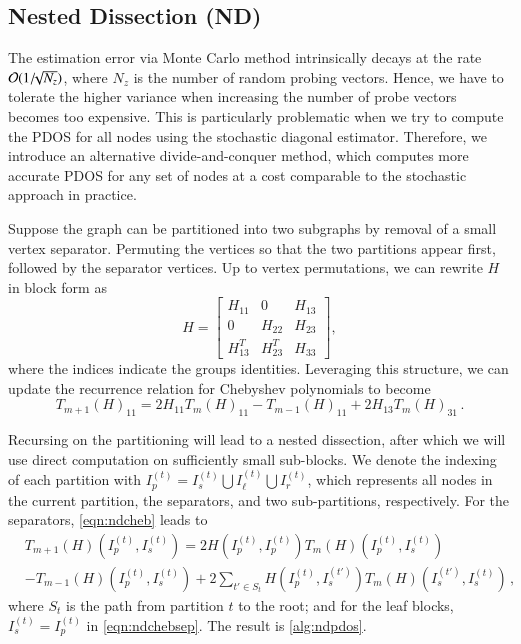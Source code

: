 \subsection{Nested Dissection (ND)}

The estimation error via Monte Carlo method intrinsically decays at the rate
$\mathcal{O}(1 /\!\!\sqrt{N_z})$, where $N_z$ is the number of random probing vectors.
Hence, we have to tolerate the higher variance when increasing the number of
probe vectors becomes too expensive. This is particularly problematic when we
try to compute the PDOS for all nodes using the stochastic diagonal estimator.
Therefore, we introduce an alternative divide-and-conquer  method, which
computes more accurate PDOS for any set of nodes at a cost comparable to the
stochastic approach in practice.

Suppose the graph can be partitioned into two subgraphs by removal of a small
vertex separator.  Permuting the vertices so that the two partitions appear
first, followed by the separator vertices. Up to vertex permutations, we can
rewrite $H$ in block form as
\begin{equation}\label{eqn:dissection}
	H = \begin{bmatrix}
	H_{11} & 0 & H_{13}\\
	0 & H_{22} & H_{23}\\
	H_{13}^T & H_{23}^T & H_{33}
	\end{bmatrix},
\end{equation}
where the indices indicate the groups identities. Leveraging this structure, we
can update the recurrence relation for Chebyshev polynomials to become
\begin{equation}\label{eqn:ndcheb}
	T_{m+1}(H)_{11} = 2H_{11}T_m(H)_{11} - T_{m-1}(H)_{11} + 2H_{13}T_m(H)_{31}\,.
\end{equation}

Recursing on the partitioning will lead to a nested dissection, after which we
will use direct computation on sufficiently small sub-blocks. We denote the
indexing of each partition with $I^{(t)}_p = I^{(t)}_s\bigcup I^{
(t)}_\ell\bigcup I^{(t)}_r$, which represents all nodes in the current
partition, the separators, and two sub-partitions, respectively. For the
separators, \cref{eqn:ndcheb} leads to
\begin{align}\label{eqn:ndchebsep}
	&T_{m+1}(H)(I^{(t)}_p,I^{(t)}_s) = 2H(I^{(t)}_p, I^{(t)}_p)T_m(H)(I^{(t)}_p,
	I^{(t)}_s) \nonumber\\
	&-T_{m-1}(H)(I^{(t)}_p,I^{(t)}_s) + 2\sum_{t'\in S_t}H(I^{(t)}_p,I^{(t')}_s)
	T_m(H)(I^{(t')}_s, I^{(t)}_s)\,,
\end{align}
where $S_t$ is the path from partition $t$ to the root; and for the leaf
blocks, $I^{(t)}_s = I^{(t)}_p$ in \cref{eqn:ndchebsep}. The result is 
\cref{alg:ndpdos}.

